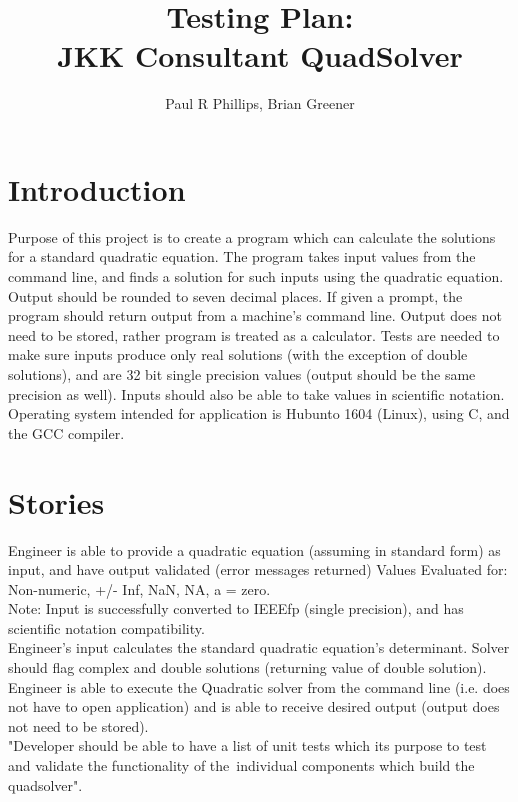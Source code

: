 \documentclass[notitlepage,a4paper,12pt]{article}
\author{Paul R Phillips, Brian Greener}
\title{Testing Plan:\\JKK Consultant QuadSolver}
\begin{document}
\maketitle

\section*{Introduction} 

Purpose of this project is to create a program which can calculate the solutions for a standard quadratic equation. The program takes input values from the command line, and finds a solution for such inputs using the quadratic equation. Output should be rounded to seven decimal places. If given a prompt, the program should return output from a machine's command line. Output does not need to be stored, rather program is treated as a calculator. Tests are needed to make sure inputs produce only real solutions (with the exception of double solutions), and are 32 bit single precision values (output should be the same precision as well). Inputs should also be able to take values in scientific notation. Operating system intended for application is Hubunto 1604 (Linux), using C, and the GCC compiler. 

\section*{Stories}
Engineer is able to provide a quadratic equation (assuming in standard form) as input, and have output validated (error messages returned)
Values Evaluated for: Non-numeric, +/- Inf, NaN, NA, a = zero. \\

Note: Input is successfully converted to IEEEfp (single precision), and has scientific notation compatibility. \\

Engineer's input calculates the standard quadratic equation's determinant. Solver should flag complex and double solutions (returning value of double solution). \\

Engineer is able to execute the Quadratic solver from the command line (i.e. does not have to open application) and is able to receive desired output (output does not need to be stored). \\

"Developer should be able to have a list of unit tests
which its purpose to test and validate the functionality of the individual components which build the quadsolver". \\
\end{document}

